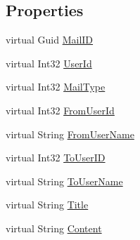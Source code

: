 \subsection*{Properties}
\begin{DoxyCompactItemize}
\item 
virtual Guid \mbox{\hyperlink{class_t_net_1_1_message_1_1_mail_message_a16d2c1be187ef6c354529f4ce11e5697}{Mail\+ID}}
\item 
virtual Int32 \mbox{\hyperlink{class_t_net_1_1_message_1_1_mail_message_aff952688f606e0f492e21965d05f73e8}{User\+Id}}
\item 
virtual Int32 \mbox{\hyperlink{class_t_net_1_1_message_1_1_mail_message_a649e5241c8ee27f02fc60242e75d0229}{Mail\+Type}}
\item 
virtual Int32 \mbox{\hyperlink{class_t_net_1_1_message_1_1_mail_message_ae168890d267190f61111924a4e884076}{From\+User\+Id}}
\item 
virtual String \mbox{\hyperlink{class_t_net_1_1_message_1_1_mail_message_af1df8e4760f8bc8019a536665439b4bb}{From\+User\+Name}}
\item 
virtual Int32 \mbox{\hyperlink{class_t_net_1_1_message_1_1_mail_message_a04400c4dab521eb2736c044a04823c82}{To\+User\+ID}}
\item 
virtual String \mbox{\hyperlink{class_t_net_1_1_message_1_1_mail_message_a68fc19f0a5581b1fa63f4e79e89755fd}{To\+User\+Name}}
\item 
virtual String \mbox{\hyperlink{class_t_net_1_1_message_1_1_mail_message_a0f183a1a6d4649fd3302f2c8e7ce3c7a}{Title}}
\item 
virtual String \mbox{\hyperlink{class_t_net_1_1_message_1_1_mail_message_aeea91e8b548c9450628b238cf1fe3184}{Content}}
\item 

\end{DoxyCompactItemize}
